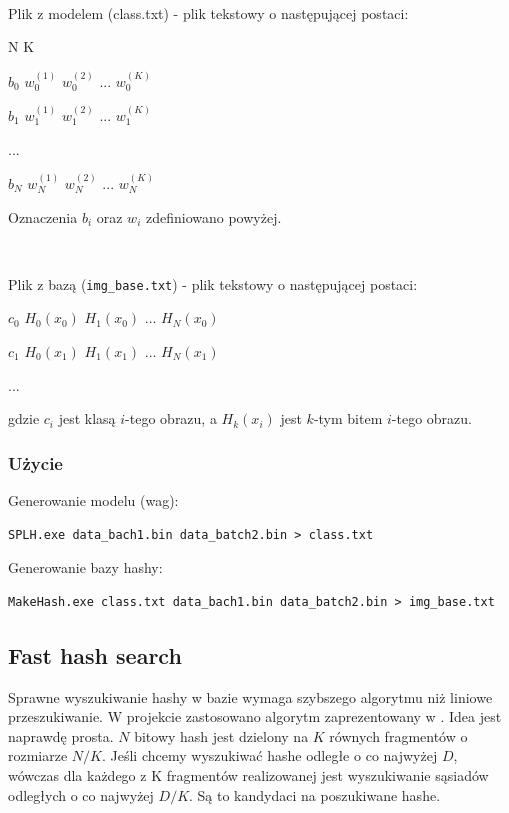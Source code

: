 \documentclass[10pt,a4paper]{article}
\begin{document}
\

Plik z modelem (class.txt) - plik tekstowy o następującej postaci:

N K

$b_0$ $w_0^{(1)}$ $w_0^{(2)}$ ... $w_0^{(K)}$

$b_1$ $w_1^{(1)}$ $w_1^{(2)}$ ... $w_1^{(K)}$

...

$b_N$ $w_N^{(1)}$ $w_N^{(2)}$ ... $w_N^{(K)}$

Oznaczenia $b_i$ oraz $w_i$ zdefiniowano powyżej.

\

Plik z bazą (\texttt{img\_base.txt}) - plik tekstowy o następującej postaci:

$c_0$ $H_0(x_0)$ $H_1(x_0)$ ... $H_N(x_0)$

$c_1$ $H_0(x_1)$ $H_1(x_1)$ ... $H_N(x_1)$

...

gdzie $c_i$ jest klasą $i$-tego obrazu, a $H_k(x_i)$ jest $k$-tym bitem $i$-tego obrazu.

\subsubsection{Użycie}

Generowanie modelu (wag):

\begin{lstlisting}
SPLH.exe data_bach1.bin data_batch2.bin > class.txt
\end{lstlisting}

Generowanie bazy hashy:

\begin{lstlisting}
MakeHash.exe class.txt data_bach1.bin data_batch2.bin > img_base.txt
\end{lstlisting}

\subsection{Fast hash search}

Sprawne wyszukiwanie hashy w bazie wymaga szybszego algorytmu niż liniowe przeszukiwanie. W projekcie zastosowano algorytm zaprezentowany w \cite{fastHash}. Idea jest naprawdę prosta. $N$ bitowy hash jest dzielony na $K$ równych fragmentów o rozmiarze $N/K$. Jeśli chcemy wyszukiwać hashe odległe o co najwyżej $D$, wówczas dla każdego z K fragmentów realizowanej jest wyszukiwanie sąsiadów odległych o co najwyżej $D/K$. Są to kandydaci na poszukiwane hashe.
\end{document}
